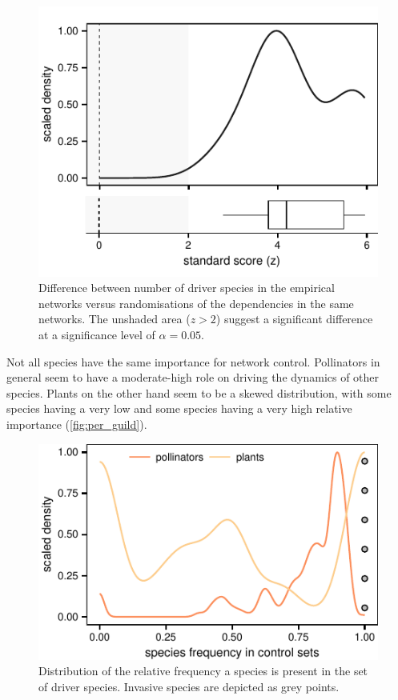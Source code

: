 \documentclass[a4paper,10pt]{article}
\begin{document}
\begin{figure}
    \centering
		\includegraphics{random_direction}
    \caption{
    Difference between number of driver species in the empirical networks versus randomisations of the dependencies in the same networks. The unshaded area ($z > 2$) suggest a significant difference at a significance level of $\alpha = 0.05$.
    }
    \label{fig:random_direction}
\end{figure} 

Not all species have the same importance for network control. Pollinators in general seem to have a moderate-high role on driving the dynamics of other species. Plants on the other hand seem to be a skewed distribution, with some species having a very low and some species having a very high relative importance (\autoref{fig:per_guild}). 

\begin{figure}
    \centering
		\includegraphics{per_guild}
    \caption{
    Distribution of the relative frequency a species is present in the set of driver species. Invasive species are depicted as grey points.
    }
    \label{fig:per_guild}
\end{figure} 
\end{document}
